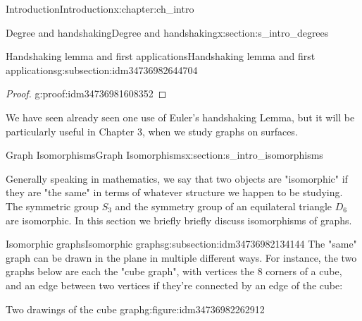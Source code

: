 \documentclass[oneside,10pt,]{book}
\numberwithin{equation}{section}
\begin{document}
\begin{chapterptx}{Introduction}{}{Introduction}{}{}{x:chapter:ch_intro}
\begin{sectionptx}{Degree and handshaking}{}{Degree and handshaking}{}{}{x:section:s_intro_degrees}
\begin{subsectionptx}{Handshaking lemma and first applications}{}{Handshaking lemma and first applications}{}{}{g:subsection:idm34736982644704}
\begin{proof}{}{g:proof:idm34736981608352}
\end{proof}
We have seen already seen one use of Euler's handshaking Lemma, but it will be particularly useful in Chapter 3, when we study graphs on surfaces.%
\end{subsectionptx}
\end{sectionptx}
%
%
\typeout{************************************************}
\typeout{************************************************}
%
\begin{sectionptx}{Graph Isomorphisms}{}{Graph Isomorphisms}{}{}{x:section:s_intro_isomorphisms}
\begin{introduction}{}%
Generally speaking in mathematics, we say that two objects are "isomorphic" if they are "the same" in terms of whatever structure we happen to be studying.  The symmetric group \(S_3\) and the symmetry group of an equilateral triangle \(D_6\) are isomorphic.  In this section we briefly briefly discuss isomorphisms of graphs.%
\end{introduction}%
%
%
\typeout{************************************************}
\typeout{************************************************}
%
\begin{subsectionptx}{Isomorphic graphs}{}{Isomorphic graphs}{}{}{g:subsection:idm34736982134144}
The "same" graph can be drawn in the plane in multiple different ways.  For instance, the two graphs below are each the "cube graph", with vertices the 8 corners of a cube, and an edge between two vertices if they're connected by an edge of the cube:%
\begin{figureptx}{Two drawings of the cube graph}{g:figure:idm34736982262912}{}%
\begin{image}{0.05}{0.9}{0.05}%
\end{image}
\end{figureptx}
\end{subsectionptx}
\end{sectionptx}
\end{chapterptx}
\end{document}

